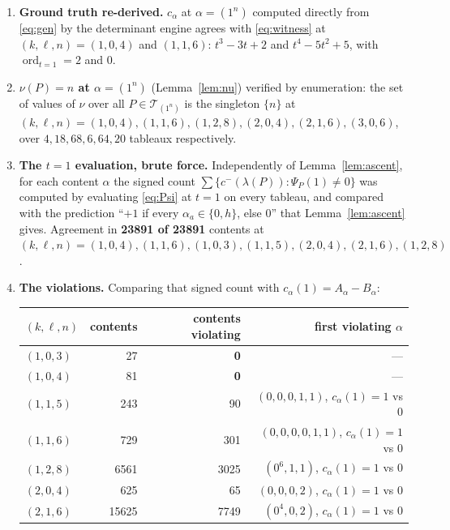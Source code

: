 \documentclass[11pt]{article}
\theoremstyle{definition}
\DeclareMathOperator{\ord}{ord}
\newcommand{\la}{\lambda}
\newcommand{\T}{\mathcal{T}}
\begin{document}
\begin{enumerate}
\item \textbf{Ground truth re-derived.} $c_\alpha$ at $\alpha=(1^n)$ computed
directly from \eqref{eq:gen} by the determinant engine agrees with
\eqref{eq:witness} at $(k,\ell,n)=(1,0,4)$ and $(1,1,6)$:
$t^{3}-3t+2$ and $t^{4}-5t^{2}+5$, with $\ord_{t=1}=2$ and $0$.
\item \textbf{$\nu(P)=n$ at $\alpha=(1^n)$} (Lemma~\ref{lem:nu}) verified by
enumeration: the set of values of $\nu$ over all $P\in\T_{(1^n)}$ is the
singleton $\{n\}$ at $(k,\ell,n)=(1,0,4),(1,1,6),(1,2,8),(2,0,4),(2,1,6),(3,0,6)$,
over $4,18,68,6,64,20$ tableaux respectively.
\item \textbf{The $t=1$ evaluation, brute force.} Independently of
Lemma~\ref{lem:ascent}, for each content $\alpha$ the signed count
$\sum\{c^{-}(\la(P)):\Psi_P(1)\ne0\}$ was computed by evaluating
\eqref{eq:Psi} at $t=1$ on every tableau, and compared with the prediction
``$+1$ if every $\alpha_a\in\{0,h\}$, else $0$'' that
Lemma~\ref{lem:ascent} gives. Agreement in \textbf{23891 of 23891} contents at
$(k,\ell,n)=(1,0,4),(1,1,6),(1,0,3),(1,1,5),(2,0,4),(2,1,6),(1,2,8)$.
\item \textbf{The violations.} Comparing that signed count with
$c_\alpha(1)=A_\alpha-B_\alpha$:

\begin{center}
\begin{tabular}{lrrr}
\hline
$(k,\ell,n)$ & contents & contents violating & first violating $\alpha$ \\
\hline
$(1,0,3)$ & 27 & \textbf{0} & --- \\
$(1,0,4)$ & 81 & \textbf{0} & --- \\
$(1,1,5)$ & 243 & 90 & $(0,0,0,1,1)$, $c_\alpha(1)=1$ vs $0$ \\
$(1,1,6)$ & 729 & 301 & $(0,0,0,0,1,1)$, $c_\alpha(1)=1$ vs $0$ \\
$(1,2,8)$ & 6561 & 3025 & $(0^6,1,1)$, $c_\alpha(1)=1$ vs $0$ \\
$(2,0,4)$ & 625 & 65 & $(0,0,0,2)$, $c_\alpha(1)=1$ vs $0$ \\
$(2,1,6)$ & 15625 & 7749 & $(0^4,0,2)$, $c_\alpha(1)=1$ vs $0$ \\
\hline
\end{tabular}
\end{center}


\end{enumerate}
\end{document}
